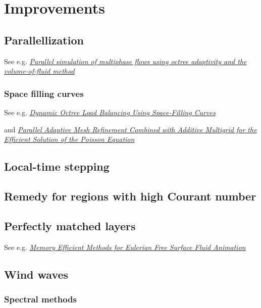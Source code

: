 \chapter{Improvements}

\section{Parallellization}

See e.g. \textit{\href{http://gfs.sourceforge.net/papers/agbaglah2011.pdf}{Parallel simulation of multiphase flows using octree adaptivity and the volume-of-fluid method}}

\subsection{Space filling curves}

See e.g. \textit{\href{http://j.teresco.org/research/publications/octpart02/octpart02.pdf}{Dynamic Octree Load Balancing Using Space-Filling Curves}}

and \textit{\href{http://downloads.isrn.com/journals/appmath/2012/246491.pdf}{Parallel Adaptive Mesh Refinement Combined with Additive Multigrid for the Efficient Solution of the Poisson Equation}}

\section{Local-time stepping}

\section{Remedy for regions with high Courant number}

\section{Perfectly matched layers}

See e.g. \textit{\href{http://liu.diva-portal.org/smash/get/diva2:359805/FULLTEXT01}{Memory Efficient Methods for Eulerian Free Surface Fluid Animation}}

\section{Wind waves}

\subsection{Spectral methods}

